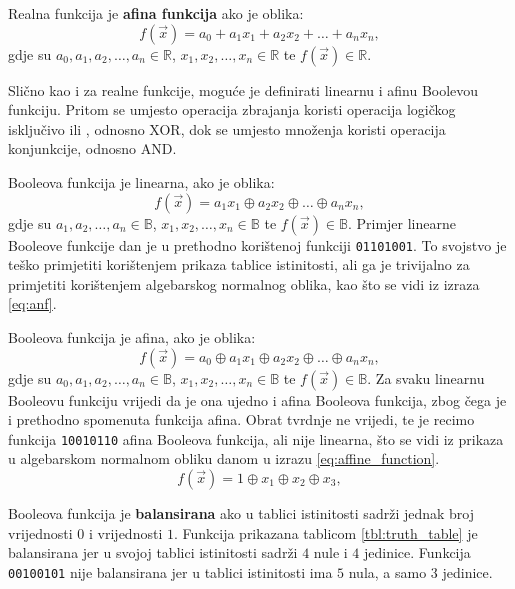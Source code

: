 Realna funkcija je \textbf{afina funkcija} ako je oblika:
\begin{equation}\label{eq:affine_definition}
    f(\vec{x}) = a_0 + a_1x_1 + a_2x_2 + \dots + a_nx_n,
\end{equation}
gdje su $a_0, a_1, a_2, \dots, a_n \in \mathds{R}$, $x_1, x_2, \dots, x_n \in \mathds{R}$ te $f(\vec{x}) \in \mathds{R}$.

Slično kao i za realne funkcije, moguće je definirati linearnu i afinu Boolevou funkciju.
Pritom se umjesto operacija zbrajanja koristi operacija logičkog isključivo ili , odnosno XOR, dok se umjesto množenja koristi operacija konjunkcije, odnosno AND.

Booleova funkcija je linearna, ako je oblika:
\begin{equation}
    f(\vec{x}) = a_1x_1 \oplus a_2x_2 \oplus \dots \oplus a_nx_n,
\end{equation}
gdje su $a_1, a_2, \dots, a_n \in \mathds{B}$, $x_1, x_2, \dots, x_n \in \mathds{B}$ te $f(\vec{x}) \in \mathds{B}$.
Primjer linearne Booleove funkcije dan je u prethodno korištenoj funkciji \texttt{01101001}.
To svojstvo je teško primjetiti korištenjem prikaza tablice istinitosti, ali ga je trivijalno za primjetiti korištenjem algebarskog normalnog oblika, kao što se vidi iz izraza \eqref{eq:anf}.

Booleova funkcija je afina, ako je oblika:
\begin{equation}
    f(\vec{x}) = a_0 \oplus a_1x_1 \oplus a_2x_2 \oplus \dots \oplus a_nx_n,
\end{equation}
gdje su $a_0, a_1, a_2, \dots, a_n \in \mathds{B}$, $x_1, x_2, \dots, x_n \in \mathds{B}$ te $f(\vec{x}) \in \mathds{B}$.
Za svaku linearnu Booleovu funkciju vrijedi da je ona ujedno i afina Booleova funkcija, zbog čega je i prethodno spomenuta funkcija afina.
Obrat tvrdnje ne vrijedi, te je recimo funkcija \texttt{10010110} afina Booleova funkcija, ali nije linearna, što se vidi iz prikaza u algebarskom normalnom obliku danom u izrazu \eqref{eq:affine_function}.
\begin{equation} \label{eq:affine_function}
    f(\vec{x}) = 1 \oplus x_1 \oplus x_2 \oplus x_3,
\end{equation}

Booleova funkcija je \textbf{balansirana} ako u tablici istinitosti sadrži jednak broj vrijednosti $0$ i vrijednosti $1$.
Funkcija prikazana tablicom \ref{tbl:truth_table} je balansirana jer u svojoj tablici istinitosti sadrži $4$ nule i $4$ jedinice.
Funkcija \texttt{00100101} nije balansirana jer u tablici istinitosti ima $5$ nula, a samo $3$ jedinice. 

